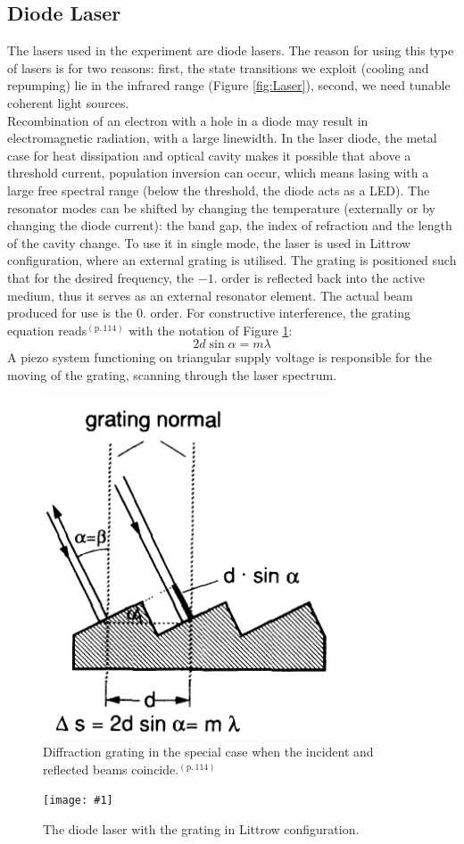 \documentclass[twocolumn]{article}
\newcommand{\insertFigure}[1]{%
   \texttt{[image: \#1]}%
}
\begin{document}
\subsection{Diode Laser}
The lasers used in the experiment are diode lasers. The reason for using this type of lasers is for two reasons: first, the state transitions we exploit (cooling and repumping) lie in the infrared range (Figure \ref{fig:Laser}), second, we need tunable coherent light sources.\\
Recombination of an electron with a hole in a diode may result in electromagnetic radiation, with a large linewidth.\cite{demtroder} In the laser diode, the metal case for heat dissipation and optical cavity makes it possible that above a threshold current, population inversion can occur, which means lasing with a large free spectral range (below the threshold, the diode acts as a LED). The resonator modes can be shifted by changing the temperature (externally or by changing the diode current): the band gap, the index of refraction and the length of the cavity change. To use it in single mode, the laser is used in Littrow configuration, where an external grating is utilised. The grating is positioned such that for the desired frequency, the $-1.$ order is reflected back into the active medium, thus it serves as an external resonator element. The actual beam produced for use is the $0.$ order. For constructive interference, the grating equation reads\cite{demtroder}$^{(\text{p.}\, 114)}$ with the notation of Figure \ref{fig:Grating}:
\begin{equation}
2 d \sin \alpha = m \lambda\nonumber
\end{equation}
A piezo system functioning on triangular supply voltage is responsible for the moving of the grating, scanning through the laser spectrum.
\begin{figure}
	\centering
	\includegraphics[scale=0.3]{Images/Grating.png}
	\caption{Diffraction grating in the special case when the incident and reflected beams coincide.\cite{demtroder}$^{(\text{p.}\, 114)}$}
	\label{fig:Grating}
\end{figure}
\begin{figure} [!h]
	\centering
	\insertFigure{Images/Diode.png}
	\caption{The diode laser with the grating in Littrow configuration.\cite{manual}}
	\label{fig:Diode}
\end{figure}
\end{document}
